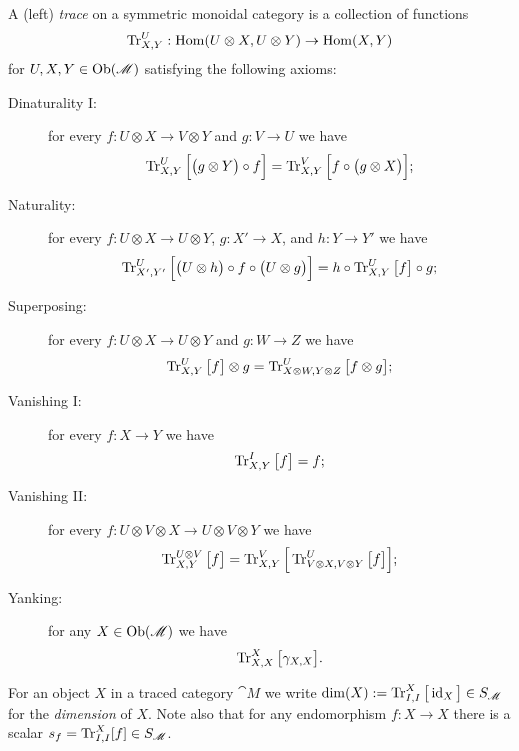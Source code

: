 \documentclass[12pt,oneside,article,draft]{memoir}
\begin{document}
A (left) \emph{trace} on a symmetric monoidal category is a collection of functions 
\[\operatorname{Tr}^U_{X,Y}:\operatorname{Hom}(U\otimes X,U\otimes Y)\to\operatorname{Hom}(X,Y)\]
for $U,X,Y\in\operatorname{Ob}(\mathscr{M})$ satisfying the following axioms:
\begin{description}
 \item [Dinaturality I:] for every $f:U\otimes X\to V\otimes Y$ and $g:V\to U$ we have
 \[\operatorname{Tr}^U_{X,Y}\Big[\big(g\otimes Y\big)\circ f\Big]=\operatorname{Tr}^V_{X,Y}\Big[f\circ\big(g\otimes X\big)\Big];\] 
 \item [Naturality:] for every $f:U\otimes X\to U\otimes Y$, $g:X'\to X$, and $h:Y\to Y'$ we have
 \[\operatorname{Tr}^U_{X',Y'}\Big[\big(U\otimes h\big)\circ f\circ\big(U\otimes g\big)\Big]=h\circ\operatorname{Tr}^U_{X,Y}\big[f\big]\circ g;\]
 \item [Superposing:] for every $f:U\otimes X\to U\otimes Y$ and $g:W\to Z$ we have
 \[\operatorname{Tr}^U_{X,Y}\big[f\big]\otimes g=\operatorname{Tr}^U_{X\otimes W,Y\otimes Z}\big[f\otimes g\big];\]
 \item [Vanishing I:] for every $f:X\to Y$ we have
 \[\operatorname{Tr}^{I}_{X,Y}\big[f\big]=f;\]
 \item [Vanishing II:] for every $f:U\otimes V\otimes X\to U\otimes V\otimes Y$ we have
 \[\operatorname{Tr}^{U\otimes V}_{X,Y}\big[f\big]=\operatorname{Tr}^V_{X,Y}\Big[\operatorname{Tr}^U_{V\otimes X,V\otimes Y}\big[f\big]\Big];\]
 \item [Yanking:] for any $X\in\operatorname{Ob}(\mathscr{M})$ we have
 \[\operatorname{Tr}^X_{X,X}\big[\gamma_{X,X}\big].\]
\end{description}

For an object $X$ in a traced category $\cat{M}$ we write $\dim(X):=\operatorname{Tr}^X_{I,I}\big[\operatorname{id}_X\big]\in S_{\mathscr{M}}$ for the {\em dimension} of $X$.  Note also that for any endomorphism $f:X\to X$ there is a scalar $s_f=\operatorname{Tr}^X_{I,I}[f]\in S_{\mathscr{M}}$.
\end{document}
